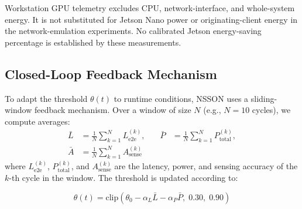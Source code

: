 \documentclass[journal]{IEEEtran}
\newcommand{\revblue}[1]{\textcolor{revblue}{#1}}
\begin{document}
Workstation GPU telemetry excludes CPU, network-interface, and
whole-system energy. It is not substituted for Jetson Nano power
or originating-client energy in the network-emulation experiments.
No calibrated Jetson energy-saving percentage is established by
these measurements.

\subsection{Closed-Loop Feedback Mechanism}
\label{sec:feedback}

To adapt the threshold $\theta(t)$ to runtime conditions, NSSON uses a sliding-window feedback mechanism. Over a window of size $N$ (e.g., $N=10$ cycles), we compute averages:
\begin{equation}
\begin{alignedat}{2}
\bar{L} &= \frac{1}{N}\sum_{k=1}^{N}L_{\text{e2e}}^{(k)}, &\quad \bar{P} &= \frac{1}{N}\sum_{k=1}^{N}P_{\text{total}}^{(k)}, \\
\bar{A} &= \frac{1}{N}\sum_{k=1}^{N}A_{\text{sense}}^{(k)} & &
\end{alignedat}
\label{eq:averages}
\end{equation}
\revblue{where $L_{\text{e2e}}^{(k)}$, $P_{\text{total}}^{(k)}$, and
$A_{\text{sense}}^{(k)}$ are the latency, power, and sensing accuracy of
the $k$-th cycle in the window. The threshold is updated according to:}

\begin{equation}
\theta(t) = \mathrm{clip}\!\left(
  \theta_0 - \alpha_L \bar{L} - \alpha_P \bar{P},\; 0.30,\; 0.90
\right)
\label{eq:theta}
\end{equation}
\end{document}
